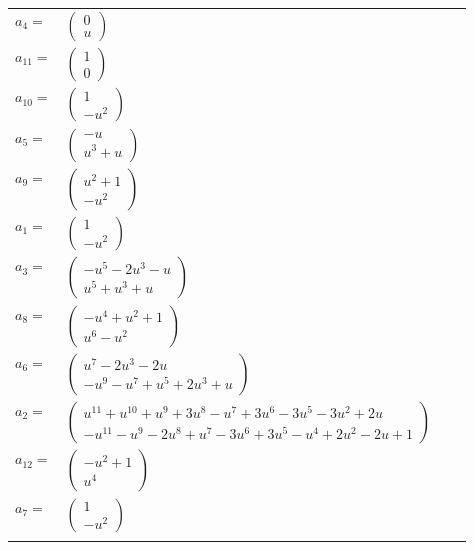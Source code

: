 \documentclass[1p]{elsarticle_modified}
\theoremstyle{definition}
\begin{document}
\begin{tabular}{m{7pt} m{180pt} m{7pt} m{180pt} }
\flushright $a_{4}=$&$\begin{pmatrix}0\\u\end{pmatrix}$ \\
\flushright $a_{11}=$&$\begin{pmatrix}1\\0\end{pmatrix}$ \\
\flushright $a_{10}=$&$\begin{pmatrix}1\\- u^2\end{pmatrix}$ \\
\flushright $a_{5}=$&$\begin{pmatrix}- u\\u^3+u\end{pmatrix}$ \\
\flushright $a_{9}=$&$\begin{pmatrix}u^2+1\\- u^2\end{pmatrix}$ \\
\flushright $a_{1}=$&$\begin{pmatrix}1\\- u^2\end{pmatrix}$ \\
\flushright $a_{3}=$&$\begin{pmatrix}- u^5-2 u^3- u\\u^5+u^3+u\end{pmatrix}$ \\
\flushright $a_{8}=$&$\begin{pmatrix}- u^4+u^2+1\\u^6- u^2\end{pmatrix}$ \\
\flushright $a_{6}=$&$\begin{pmatrix}u^7-2 u^3-2 u\\- u^9- u^7+u^5+2 u^3+u\end{pmatrix}$ \\
\flushright $a_{2}=$&$\begin{pmatrix}u^{11}+u^{10}+u^9+3 u^8- u^7+3 u^6-3 u^5-3 u^2+2 u\\- u^{11}- u^9-2 u^8+u^7-3 u^6+3 u^5- u^4+2 u^2-2 u+1\end{pmatrix}$ \\
\flushright $a_{12}=$&$\begin{pmatrix}- u^2+1\\u^4\end{pmatrix}$ \\
\flushright $a_{7}=$&$\begin{pmatrix}1\\- u^2\end{pmatrix}$\\&\end{tabular}
\end{document}
